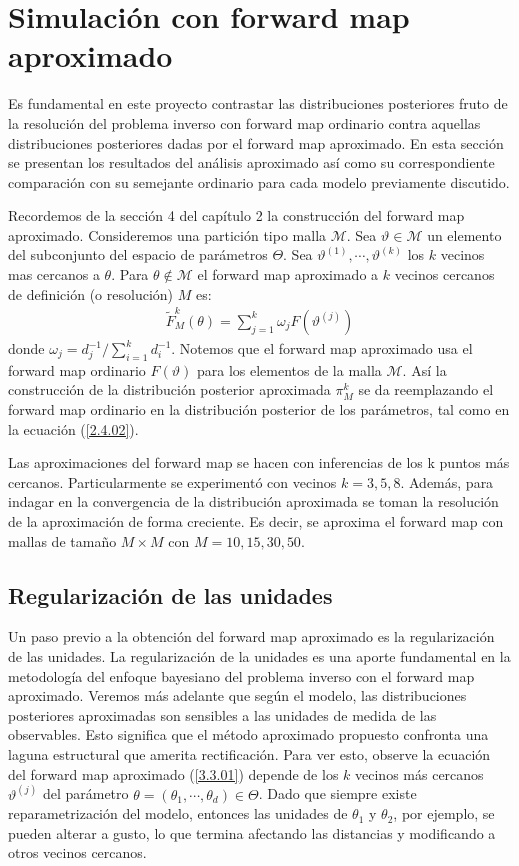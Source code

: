 \section{Simulación con forward map aproximado}

Es fundamental en este proyecto contrastar las distribuciones posteriores fruto de la resolución del problema inverso con forward map ordinario contra aquellas distribuciones posteriores dadas por el forward map aproximado. En esta sección se presentan los resultados del análisis aproximado así como su correspondiente comparación con su semejante ordinario para cada modelo previamente discutido.

Recordemos de la sección 4 del capítulo 2 la construcción del forward map aproximado. Consideremos una partición tipo malla $\mathcal{M}$. Sea $\vartheta \in \mathcal{M}$ un elemento del subconjunto del espacio de parámetros $\Theta$. Sea $\vartheta^{(1)},\cdots, \vartheta^{(k)}$ los $k$ vecinos mas cercanos a $\theta$. Para $\theta \notin \mathcal{M}$ el forward map aproximado a $k$ vecinos cercanos de definición (o resolución)  $M$ es:
\begin{align}
    \tilde{F}^{k}_M(\theta) = \sum_{j = 1}^{k} \omega_j F \left(\vartheta^{(j)}\right)
    \label{3.3.01}
\end{align}
donde $\omega_j = d_j^{-1}/ \sum_{i=1}^{k} d_i^{-1}$. Notemos que el forward map aproximado usa el forward map ordinario $F(\vartheta)$ para los elementos de la malla $\mathcal{M}$. Así la construcción de la distribución posterior aproximada $\pi_{M}^{k}$ se da reemplazando el forward map ordinario en la distribución posterior de los parámetros, tal como en la ecuación (\ref{2.4.02}).

Las aproximaciones del forward map se hacen con inferencias de los k puntos más cercanos. Particularmente se experimentó con vecinos $k = 3,5,8$. Además, para indagar en la convergencia de la distribución aproximada se toman la resolución de la aproximación de forma creciente. Es decir, se aproxima el forward map con mallas de tamaño $M \times M$ con $M = 10, 15, 30, 50$.

\subsection*{Regularización de las unidades}

Un paso previo a la obtención del forward map aproximado es la regularización de las unidades. La regularización de la unidades es una aporte fundamental en la metodología del enfoque bayesiano del problema inverso con el forward map aproximado. Veremos más adelante que según el modelo, las distribuciones posteriores aproximadas son sensibles a las unidades de medida de las observables. Esto significa que el método aproximado propuesto confronta una laguna estructural que amerita rectificación. Para ver esto, observe la ecuación del forward map aproximado (\ref{3.3.01}) depende de los $k$ vecinos más cercanos $\vartheta^{(j)}$ del parámetro $\theta =(\theta_1,\cdots,\theta_d)\in \Theta$. Dado que siempre existe reparametrización del modelo, entonces las unidades de $\theta_1$ y $\theta_2$, por ejemplo, se pueden alterar a gusto, lo que termina afectando las distancias y modificando a otros vecinos cercanos. 

